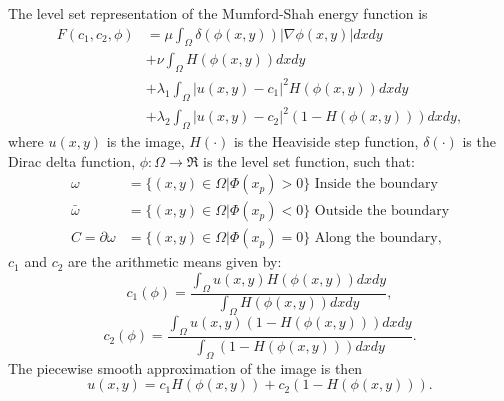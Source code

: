 The level set representation of the Mumford-Shah energy function is 
\begin{equation}
	\begin{split}
		F(c_1, c_2, \phi) & = \mu \int_\Omega \delta(\phi(x,y))|\nabla\phi(x,y)|dxdy \\
		& + \nu \int_\Omega H(\phi(x,y))dxdy \\
		& + \lambda_1 \int_\Omega |u(x,y)-c_1|^2H(\phi(x,y))dxdy \\
		& + \lambda_2 \int_\Omega |u(x,y)-c_2|^2(1-H(\phi(x,y)))dxdy,
	\end{split}
	\label{eq:mumfordshahfunction}
\end{equation}
where $u(x,y)$ is the image, $H(\cdot)$ is the Heaviside step function, $\delta(\cdot)$ is the Dirac delta function, $\phi:\Omega \rightarrow \Re$ is the level set function, such that:
\begin{equation}
	\begin{split}
		\omega & = \{(x,y) \in \Omega|\Phi(x_p)>0\} \text{ Inside the boundary} \\
		\bar{\omega} & = \{(x,y) \in \Omega|\Phi(x_p)<0\} \text{ Outside the boundary} \\
		C = \partial\omega & = \{(x,y) \in \Omega|\Phi(x_p)=0\} \text{ Along the boundary},
	\end{split}
	\label{eq:levelsetrepresentation}
\end{equation}
$c_1$ and $c_2$ are the arithmetic means given by:
\begin{equation}
	c_1(\phi) = \frac{\int_\Omega u(x,y)H(\phi(x,y))dxdy}{\int_\Omega H(\phi(x,y))dxdy},
	\label{eq:c1}
\end{equation}
\begin{equation}
c_2(\phi) = \frac{\int_\Omega u(x,y)(1-H(\phi(x,y)))dxdy}{\int_\Omega (1-H(\phi(x,y)))dxdy}.
\label{eq:c2}
\end{equation}
The piecewise smooth approximation of the image is then 
\begin{equation}
	u(x,y) = c_1 H(\phi(x,y)) + c_2(1-H(\phi(x,y))).
	\label{eq:piecewiseapproximation}
\end{equation}

